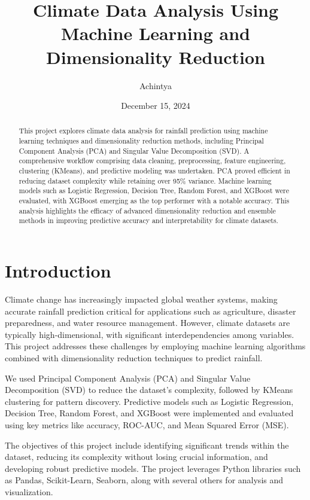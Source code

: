 \documentclass[12pt]{article}
\begin{document}
\title{\textbf{Climate Data Analysis Using Machine Learning and Dimensionality Reduction}}
\author{\LARGE Achintya}

\date{December 15, 2024}

\maketitle

\begin{abstract}
This project explores climate data analysis for rainfall prediction using machine learning techniques and dimensionality reduction methods, including Principal Component Analysis (PCA) and Singular Value Decomposition (SVD). A comprehensive workflow comprising data cleaning, preprocessing, feature engineering, clustering (KMeans), and predictive modeling was undertaken. PCA proved efficient in reducing dataset complexity while retaining over 95\% variance. Machine learning models such as Logistic Regression, Decision Tree, Random Forest, and XGBoost were evaluated, with XGBoost emerging as the top performer with a notable accuracy. This analysis highlights the efficacy of advanced dimensionality reduction and ensemble methods in improving predictive accuracy and interpretability for climate datasets.
\end{abstract}

\section{Introduction}
Climate change has increasingly impacted global weather systems, making accurate rainfall prediction critical for applications such as agriculture, disaster preparedness, and water resource management. However, climate datasets are typically high-dimensional, with significant interdependencies among variables. This project addresses these challenges by employing machine learning algorithms combined with dimensionality reduction techniques to predict rainfall. 

We used Principal Component Analysis (PCA) and Singular Value Decomposition (SVD) to reduce the dataset's complexity, followed by KMeans clustering for pattern discovery. Predictive models such as Logistic Regression, Decision Tree, Random Forest, and XGBoost were implemented and evaluated using key metrics like accuracy, ROC-AUC, and Mean Squared Error (MSE). 


The objectives of this project include identifying significant trends within the dataset, reducing its complexity without losing crucial information, and developing robust predictive models.
The project leverages Python libraries such as Pandas, Scikit-Learn, Seaborn, along with several others for analysis and visualization.
\end{document}
